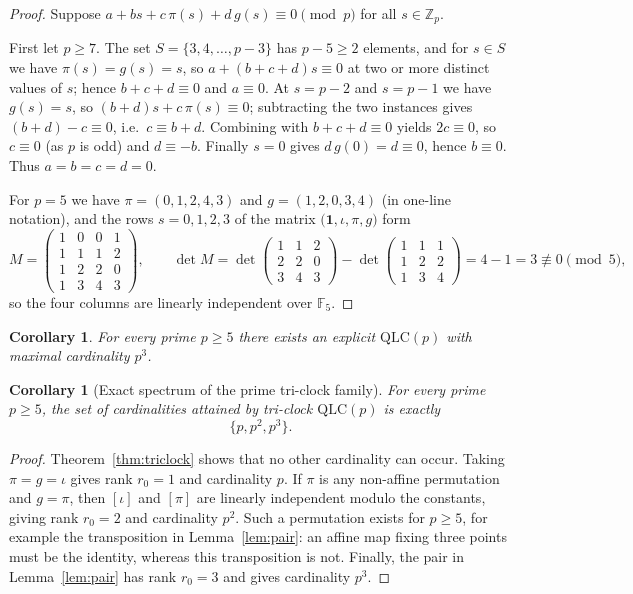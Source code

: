\documentclass[11pt]{amsart}
\newtheorem{corollary}[theorem]{Corollary}
\theoremstyle{definition}
\newcommand{\Z}{\mathbb{Z}}
\newcommand{\F}{\mathbb{F}}
\newcommand{\QLC}{\mathrm{QLC}}
\begin{document}
\begin{proof}
Suppose $a+bs+c\,\pi(s)+d\,g(s)\equiv0\pmod p$ for all $s\in\Z_p$.

First let $p\ge7$.  The set $S=\{3,4,\dots,p-3\}$ has $p-5\ge2$ elements,
and for $s\in S$ we have $\pi(s)=g(s)=s$, so $a+(b+c+d)s\equiv0$ at two or
more distinct values of $s$; hence $b+c+d\equiv0$ and $a\equiv0$.  At
$s=p-2$ and $s=p-1$ we have $g(s)=s$, so $(b+d)s+c\,\pi(s)\equiv0$;
subtracting the two instances gives $(b+d)-c\equiv0$, i.e.\ $c\equiv b+d$.
Combining with $b+c+d\equiv0$ yields $2c\equiv0$, so $c\equiv0$ (as $p$ is
odd) and $d\equiv-b$.  Finally $s=0$ gives $d\,g(0)=d\equiv0$, hence
$b\equiv0$.  Thus $a=b=c=d=0$.

For $p=5$ we have $\pi=(0,1,2,4,3)$ and $g=(1,2,0,3,4)$ (in one-line
notation), and the rows $s=0,1,2,3$ of the matrix
$\bigl(\mathbf1,\iota,\pi,g\bigr)$ form
\[
M=\begin{pmatrix}
1&0&0&1\\ 1&1&1&2\\ 1&2&2&0\\ 1&3&4&3
\end{pmatrix},
\qquad
\det M
=\det\!\begin{pmatrix}1&1&2\\2&2&0\\3&4&3\end{pmatrix}
-\det\!\begin{pmatrix}1&1&1\\1&2&2\\1&3&4\end{pmatrix}
=4-1=3\not\equiv0\pmod 5 ,
\]
so the four columns are linearly independent over $\F_5$.
\end{proof}

\begin{corollary}\label{cor:prime}
For every prime $p\ge5$ there exists an explicit $\QLC(p)$ with maximal
cardinality $p^3$.
\end{corollary}

\begin{corollary}[Exact spectrum of the prime tri-clock family]
\label{cor:triclock-spectrum}
For every prime $p\ge5$, the set of cardinalities attained by tri-clock
$\QLC(p)$ is exactly
\[
\{p,p^2,p^3\}.
\]
\end{corollary}

\begin{proof}
Theorem~\ref{thm:triclock} shows that no other cardinality can occur.  Taking
$\pi=g=\iota$ gives rank $r_0=1$ and cardinality $p$.  If $\pi$ is any
non-affine permutation and $g=\pi$, then $[\iota]$ and $[\pi]$ are linearly
independent modulo the constants, giving rank $r_0=2$ and cardinality $p^2$.
Such a permutation exists for $p\ge5$, for example the transposition in
Lemma~\ref{lem:pair}: an affine map fixing three points must be the identity,
whereas this transposition is not.  Finally, the pair in Lemma~\ref{lem:pair}
has rank $r_0=3$ and gives cardinality $p^3$.
\end{proof}
\end{document}
